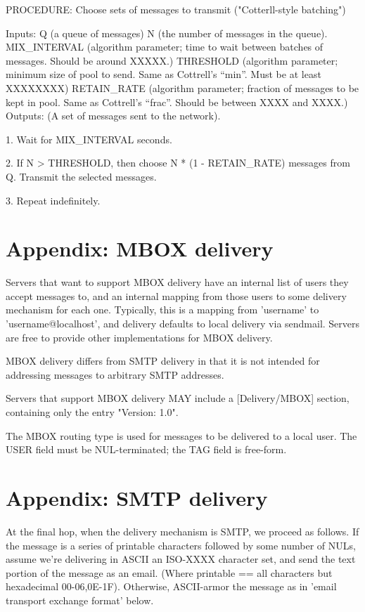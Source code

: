 PROCEDURE: Choose sets of messages to transmit ("Cotterll-style batching")

Inputs: Q (a queue of messages)
        N (the number of messages in the queue).
	MIX_INTERVAL (algorithm parameter; time to wait between
                      batches of messages.  Should be around XXXXX.)
        THRESHOLD (algorithm parameter; minimum size of pool to send. 
                   Same as Cottrell's ``min''.  Must be at least XXXXXXXX)
        RETAIN_RATE (algorithm parameter; fraction of messages to be
                   kept in pool.  Same as Cottrell's ``frac''.
                   Should be between XXXX and XXXX.)
Outputs: (A set of messages sent to the network).

1. Wait for MIX_INTERVAL seconds.

2. If N > THRESHOLD, then choose N * (1 - RETAIN_RATE) messages from
    Q.  Transmit the selected messages.

3. Repeat indefinitely.

\section{Appendix: MBOX delivery}

Servers that want to support MBOX delivery have an internal list of
users they accept messages to, and an internal mapping from those
users to some delivery mechanism for each one.  Typically, this is a
mapping from 'username' to 'username@localhost', and delivery defaults
to local delivery via sendmail.  Servers are free to provide other
implementations for MBOX delivery.

MBOX delivery differs from SMTP delivery in that it is not intended
for addressing messages to arbitrary SMTP addresses.

Servers that support MBOX delivery MAY include a [Delivery/MBOX]
section, containing only the entry "Version: 1.0".

The MBOX routing type is used for messages to be delivered to a local
user.  The USER field must be NUL-terminated; the TAG field is
free-form. 

\section{Appendix: SMTP delivery}

At the final hop, when the delivery mechanism is SMTP, we proceed as
follows.  If the message is a series of printable characters followed
by some number of NULs, assume we're delivering in ASCII an ISO-XXXX
character set, and send the text portion of the message as an email.
(Where printable == {all characters but hexadecimal 00-06,0E-1F}).
Otherwise, ASCII-armor the message as in 'email transport exchange
format' below.

